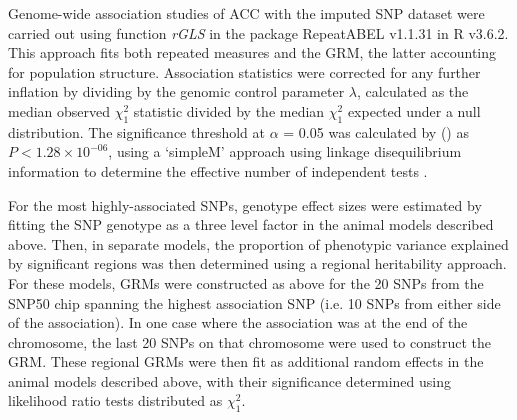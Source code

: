 \documentclass[a4paper,11pt]{article}
\begin{document}

Genome-wide association studies of ACC with the imputed SNP dataset were carried out using function \textit{rGLS} in the package RepeatABEL v1.1.31 \citep{Ronnegard2016} in R v3.6.2. This approach fits both repeated measures and the GRM, the latter accounting for population structure. Association statistics were corrected for any further inflation by dividing by the genomic control parameter $\lambda$, calculated as the median observed $\chi^{2}_{1}$ statistic divided by the median $\chi^{2}_{1}$ expected under a null distribution. The significance threshold at $\alpha$ = 0.05 was calculated by \citeauthor{Stoffel2020} (\citeyear{Stoffel2020}) as $P < 1.28 \times 10^{-06}$, using a `simpleM' approach using linkage disequilibrium information to determine the effective number of independent tests \citep{Gao2008}.

For the most highly-associated SNPs, genotype effect sizes were estimated by fitting the SNP genotype as a three level factor in the animal models described above. Then, in separate models, the proportion of phenotypic variance explained by significant regions was then determined using a regional heritability approach. For these models, GRMs were constructed as above for the 20 SNPs from the SNP50 chip spanning the highest association SNP (i.e. 10 SNPs from either side of the association). In one case where the association was at the end of the chromosome, the last 20 SNPs on that chromosome were used to construct the GRM. These regional GRMs were then fit as additional random effects in the animal models described above, with their significance determined using likelihood ratio tests distributed as $\chi^{2}_{1}$.
\end{document}
